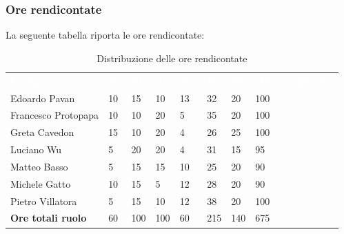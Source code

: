 \subsubsection{Ore rendicontate}
La seguente tabella riporta le ore rendicontate: 
\begin{table}[!htbp]
\begin{center}
\renewcommand{\arraystretch}{1.25}
\begin{tabular}{ m{}<{\centering}  m{}<{\centering} m{}<{\centering} m{}<{\centering}  m{}<{\centering}  m{}<{\centering}  m{}<{\centering}  m{}<{\centering}   }
	\rowcolor{darkblue}
	\textcolor{white}{\textbf{Componente}} &\textcolor{white}{\textbf{Re}}&\textcolor{white}{\textbf{Pt}}&\textcolor{white}{\textbf{An}}&\textcolor{white}{\textbf{Am}}&\textcolor{white}{\textbf{Pr}}&\textcolor{white}{\textbf{Ve}}&\textcolor{white}{\textbf{Ore complessive}}\\ 
	Edoardo Pavan & 10 & 15 & 10 & 13 & 32 & 20 & 100 \\	
	
	Francesco Protopapa & 10 & 10 & 20 & 5 & 35 & 20 & 100 \\

	Greta Cavedon & 15 & 10 & 20 & 4 & 26 & 25 & 100 \\
	
	Luciano Wu & 5 & 20 & 20 & 4 & 31 & 15 & 95 \\
	
	Matteo Basso & 5 & 15 & 15 & 10 & 25 & 20 & 90 \\
	
	Michele Gatto & 10 & 15 & 5 & 12 & 28 & 20 & 90 \\
	
	Pietro Villatora & 5 & 15 & 10 & 12 & 38 & 20 & 100 \\
	
	\textbf{Ore totali ruolo} & 60 & 100 & 100 & 60 & 215 & 140 & 675 \\

\end{tabular}
\caption{Distribuzione delle ore rendicontate}
\end{center}
\end{table}


